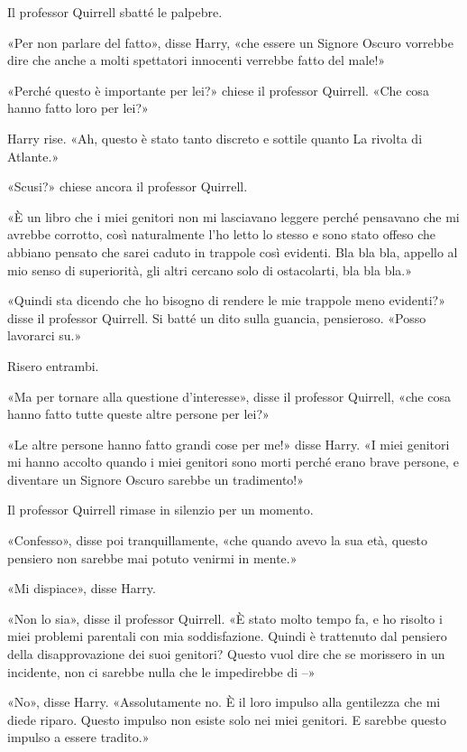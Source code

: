 Il professor Quirrell sbatté le palpebre.

«Per non parlare del fatto», disse Harry, «che essere un Signore Oscuro vorrebbe dire che anche a molti spettatori innocenti verrebbe fatto del male!»

«Perché questo è importante per lei?» chiese il professor Quirrell. «Che cosa hanno fatto loro per lei?»

Harry rise. «Ah, questo è stato tanto discreto e sottile quanto La rivolta di Atlante.»

«Scusi?» chiese ancora il professor Quirrell.

«È un libro che i miei genitori non mi lasciavano leggere perché pensavano che mi avrebbe corrotto, così naturalmente l’ho letto lo stesso e sono stato offeso che abbiano pensato che sarei caduto in trappole così evidenti. Bla bla bla, appello al mio senso di superiorità, gli altri cercano solo di ostacolarti, bla bla bla.»

«Quindi sta dicendo che ho bisogno di rendere le mie trappole meno evidenti?» disse il professor Quirrell. Si batté un dito sulla guancia, pensieroso. «Posso lavorarci su.»

Risero entrambi.

«Ma per tornare alla questione d’interesse», disse il professor Quirrell, «che cosa hanno fatto tutte queste altre persone per lei?»

«Le altre persone hanno fatto grandi cose per me!» disse Harry. «I miei genitori mi hanno accolto quando i miei genitori sono morti perché erano brave persone, e diventare un Signore Oscuro sarebbe un tradimento!»

Il professor Quirrell rimase in silenzio per un momento.

«Confesso», disse poi tranquillamente, «che quando avevo la sua età, questo pensiero non sarebbe mai potuto venirmi in mente.»

«Mi dispiace», disse Harry.

«Non lo sia», disse il professor Quirrell. «È stato molto tempo fa, e ho risolto i miei problemi parentali con mia soddisfazione. Quindi è trattenuto dal pensiero della disapprovazione dei suoi genitori? Questo vuol dire che se morissero in un incidente, non ci sarebbe nulla che le impedirebbe di –»

«No», disse Harry. «Assolutamente no. È il loro impulso alla gentilezza che mi diede riparo. Questo impulso non esiste solo nei miei genitori. E sarebbe questo impulso a essere tradito.»

